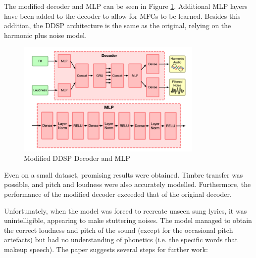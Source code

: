 The modified decoder and MLP can be seen in Figure \ref{fig:singing_decoder_mlp}. Additional MLP layers have been added to the decoder to allow for MFCs to be learned. Besides this addition, the DDSP architecture is the same as the original, relying on the harmonic plus noise model.

\vspace{0.5cm}
\vspace{0.5cm}

\begin{figure}[H]
    \centering
    \includegraphics[width=0.8\textwidth]{literature_review/SingingDecoderMLP.png}
    \caption{Modified DDSP Decoder and MLP\cite{SingingDDSP}}
    \label{fig:singing_decoder_mlp}
\end{figure}

Even on a small dataset, promising results were obtained. Timbre transfer was possible, and pitch and loudness were also accurately modelled. Furthermore, the performance of the modified decoder exceeded that of the original decoder.

Unfortunately, when the model was forced to recreate unseen sung lyrics, it was unintelligible, appearing to make stuttering noises. The model managed to obtain the correct loudness and pitch of the sound (except for the occasional pitch artefacts) but had no understanding of phonetics (i.e. the specific words that makeup speech). The paper suggests several steps for further work:

